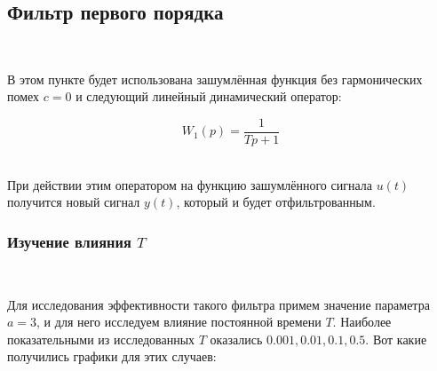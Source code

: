 \documentclass[a4paper]{article}
\begin{document}
\subsection{Фильтр первого порядка}\

В этом пункте будет использована зашумлённая функция без гармонических помех $c = 0$ и следующий линейный динамический оператор:

$$
W_1(p) = \frac{1}{Tp+1}
$$\

При действии этим оператором на функцию зашумлённого сигнала $u(t)$ получится новый сигнал $y(t)$, который и будет отфильтрованным.\ 

\subsubsection{Изучение влияния $T$}\

Для исследования эффективности такого фильтра примем значение параметра $a = 3$, и для него исследуем влияние постоянной времени $T$. Наиболее показательными из исследованных $T$ оказались $0.001, 0.01, 0.1, 0.5$. Вот какие получились графики для этих случаев:
\end{document}
